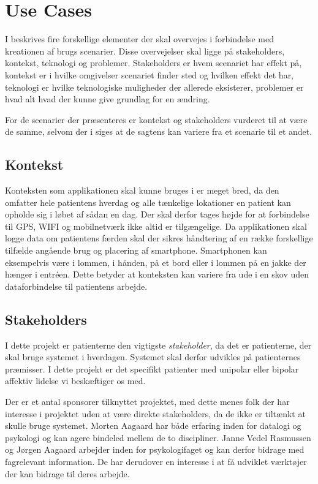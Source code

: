 \section{Use Cases}
I \citet[Afsnit 13.3, s83, nederst]{art:essence} beskrives fire forskellige elementer der skal overvejes i forbindelse med kreationen af brugs scenarier.
Disse overvejelser skal ligge på stakeholders, kontekst, teknologi og problemer.
Stakeholders er hvem scenariet har effekt på, kontekst er i hvilke omgivelser scenariet finder sted og hvilken effekt det har, teknologi er hvilke teknologiske muligheder der allerede eksisterer, problemer er hvad alt hvad der kunne give grundlag for en ændring.

For de scenarier der præsenteres er kontekst og stakeholders vurderet til at være de samme, selvom der i \citet[Afsnit 13.3, s83, nederst]{art:essence} siges at de sagtens kan variere fra et scenarie til et andet.

\subsection{Kontekst}
Konteksten som applikationen skal kunne bruges i er meget bred, da den omfatter hele patientens hverdag og alle tænkelige lokationer en patient kan opholde sig i løbet af sådan en dag.
Der skal derfor tages højde for at forbindelse til GPS, WIFI og mobilnetværk ikke altid er tilgængelige.
Da applikationen skal logge data om patientens færden skal der sikres håndtering af en række forskellige tilfælde angående brug og placering af smartphone.
Smartphonen kan eksempelvis være i lommen, i hånden, på et bord eller i lommen på en jakke der hænger i entréen.
Dette betyder at konteksten kan variere fra ude i en skov uden dataforbindelse til patientens arbejde.

\subsection{Stakeholders}
I dette projekt er patienterne den vigtigste \textit{stakeholder}, da det er patienterne, der skal bruge systemet i hverdagen.
Systemet skal derfor udvikles på patienternes præmisser.
I dette projekt er det specifikt patienter med unipolar eller bipolar affektiv lidelse vi beskæftiger os med.

Der er et antal sponsorer tilknyttet projektet, med dette menes folk der har interesse i projektet uden at være direkte stakeholders, da de ikke er tiltænkt at skulle bruge systemet.
Morten Aagaard har både erfaring inden for datalogi og psykologi og kan agere bindeled mellem de to discipliner.
Janne Vedel Rasmussen og Jørgen Aagaard arbejder inden for psykologifaget og kan derfor bidrage med fagrelevant information.
De har derudover en interesse i at få udviklet værktøjer der kan bidrage til deres arbejde.

